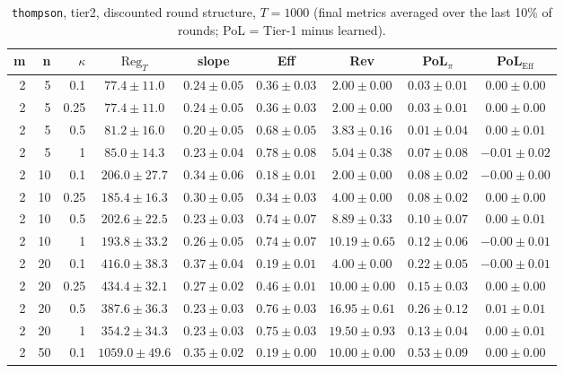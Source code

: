 \begin{table}[htbp]
\centering
\scriptsize
\caption{\texttt{thompson}, tier2, discounted round structure, $T=1000$ (final metrics averaged over the last 10\% of rounds; PoL = Tier-1 minus learned).}
\label{tab:tier2_thompson_discounted}
\begin{tabular}{@{}rrrcccccc@{}}
\toprule
m & n & $\kappa$ & $\mathrm{Reg}_T$ & slope & Eff & Rev & PoL$_\pi$ & PoL$_\mathrm{Eff}$ \\
\midrule
2 & 5 & 0.1 & $77.4 \pm 11.0$ & $0.24 \pm 0.05$ & $0.36 \pm 0.03$ & $2.00 \pm 0.00$ & $0.03 \pm 0.01$ & $0.00 \pm 0.00$ \\
2 & 5 & 0.25 & $77.4 \pm 11.0$ & $0.24 \pm 0.05$ & $0.36 \pm 0.03$ & $2.00 \pm 0.00$ & $0.03 \pm 0.01$ & $0.00 \pm 0.00$ \\
2 & 5 & 0.5 & $81.2 \pm 16.0$ & $0.20 \pm 0.05$ & $0.68 \pm 0.05$ & $3.83 \pm 0.16$ & $0.01 \pm 0.04$ & $0.00 \pm 0.01$ \\
2 & 5 & 1 & $85.0 \pm 14.3$ & $0.23 \pm 0.04$ & $0.78 \pm 0.08$ & $5.04 \pm 0.38$ & $0.07 \pm 0.08$ & $-0.01 \pm 0.02$ \\
2 & 10 & 0.1 & $206.0 \pm 27.7$ & $0.34 \pm 0.06$ & $0.18 \pm 0.01$ & $2.00 \pm 0.00$ & $0.08 \pm 0.02$ & $-0.00 \pm 0.00$ \\
2 & 10 & 0.25 & $185.4 \pm 16.3$ & $0.30 \pm 0.05$ & $0.34 \pm 0.03$ & $4.00 \pm 0.00$ & $0.08 \pm 0.02$ & $0.00 \pm 0.00$ \\
2 & 10 & 0.5 & $202.6 \pm 22.5$ & $0.23 \pm 0.03$ & $0.74 \pm 0.07$ & $8.89 \pm 0.33$ & $0.10 \pm 0.07$ & $0.00 \pm 0.01$ \\
2 & 10 & 1 & $193.8 \pm 33.2$ & $0.26 \pm 0.05$ & $0.74 \pm 0.07$ & $10.19 \pm 0.65$ & $0.12 \pm 0.06$ & $-0.00 \pm 0.01$ \\
2 & 20 & 0.1 & $416.0 \pm 38.3$ & $0.37 \pm 0.04$ & $0.19 \pm 0.01$ & $4.00 \pm 0.00$ & $0.22 \pm 0.05$ & $-0.00 \pm 0.01$ \\
2 & 20 & 0.25 & $434.4 \pm 32.1$ & $0.27 \pm 0.02$ & $0.46 \pm 0.01$ & $10.00 \pm 0.00$ & $0.15 \pm 0.03$ & $0.00 \pm 0.00$ \\
2 & 20 & 0.5 & $387.6 \pm 36.3$ & $0.23 \pm 0.03$ & $0.76 \pm 0.03$ & $16.95 \pm 0.61$ & $0.26 \pm 0.12$ & $0.01 \pm 0.01$ \\
2 & 20 & 1 & $354.2 \pm 34.3$ & $0.23 \pm 0.03$ & $0.75 \pm 0.03$ & $19.50 \pm 0.93$ & $0.13 \pm 0.04$ & $0.00 \pm 0.01$ \\
2 & 50 & 0.1 & $1059.0 \pm 49.6$ & $0.35 \pm 0.02$ & $0.19 \pm 0.00$ & $10.00 \pm 0.00$ & $0.53 \pm 0.09$ & $0.00 \pm 0.00$ \\

\end{tabular}
\end{table}
